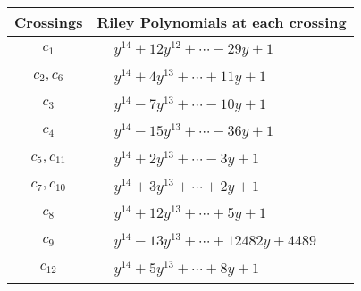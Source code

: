 \documentclass[1p]{elsarticle_modified}
\theoremstyle{definition}
\begin{document}
\begin{tabular}{m{50pt}|m{274pt}}
Crossings & \hspace{64pt}Riley Polynomials at each crossing \\
\hline $$\begin{aligned}c_{1}\end{aligned}$$&$\begin{aligned}
&y^{14}+12 y^{12}+\cdots-29 y+1
\end{aligned}$\\
\hline $$\begin{aligned}c_{2},c_{6}\end{aligned}$$&$\begin{aligned}
&y^{14}+4 y^{13}+\cdots+11 y+1
\end{aligned}$\\
\hline $$\begin{aligned}c_{3}\end{aligned}$$&$\begin{aligned}
&y^{14}-7 y^{13}+\cdots-10 y+1
\end{aligned}$\\
\hline $$\begin{aligned}c_{4}\end{aligned}$$&$\begin{aligned}
&y^{14}-15 y^{13}+\cdots-36 y+1
\end{aligned}$\\
\hline $$\begin{aligned}c_{5},c_{11}\end{aligned}$$&$\begin{aligned}
&y^{14}+2 y^{13}+\cdots-3 y+1
\end{aligned}$\\
\hline $$\begin{aligned}c_{7},c_{10}\end{aligned}$$&$\begin{aligned}
&y^{14}+3 y^{13}+\cdots+2 y+1
\end{aligned}$\\
\hline $$\begin{aligned}c_{8}\end{aligned}$$&$\begin{aligned}
&y^{14}+12 y^{13}+\cdots+5 y+1
\end{aligned}$\\
\hline $$\begin{aligned}c_{9}\end{aligned}$$&$\begin{aligned}
&y^{14}-13 y^{13}+\cdots+12482 y+4489
\end{aligned}$\\
\hline $$\begin{aligned}c_{12}\end{aligned}$$&$\begin{aligned}
&y^{14}+5 y^{13}+\cdots+8 y+1
\end{aligned}$\\
\hline
\end{tabular}\\~\\
\end{document}

